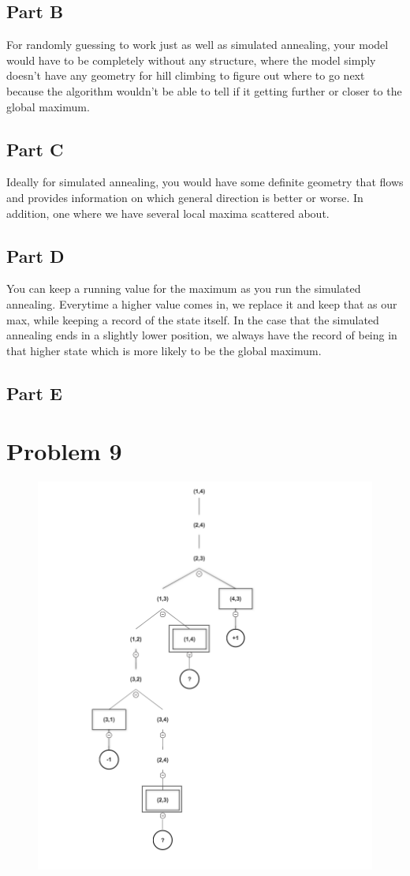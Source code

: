 \documentclass[12pt]{article}
\begin{document}
		\subsection*{Part B}
		For randomly guessing to work just as well as simulated annealing, your model would have to be completely without any structure, where the model simply doesn’t have any geometry for hill climbing to figure out where to go next because the algorithm wouldn’t be able to tell if it getting further or closer to the global maximum.
		\subsection*{Part C}
		Ideally for simulated annealing, you would have some definite geometry that flows and provides information on which general direction is better or worse. In addition, one where we have several local maxima scattered about.
		\subsection*{Part D}
		You can keep a running value for the maximum as you run the simulated annealing. Everytime a higher value comes in, we replace it and keep that as our max, while keeping a record of the state itself. In the case that the simulated annealing ends in a slightly lower position, we always have the record of being in that higher state which is more likely to be the global maximum.
		\subsection*{Part E}
	
	\section*{Problem 9}
		\begin{figure}[!htb]
			\centering
			\includegraphics[width=.8\textwidth]{Question9.png}

		\end{figure}  
\end{document}

